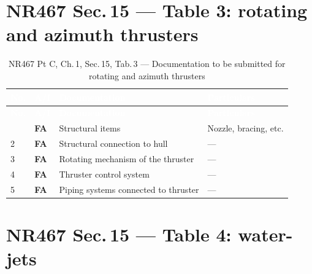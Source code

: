 \documentclass[11pt,a4paper]{report}
\newcommand{\fa}{\textbf{\textcolor{warningred}{FA}}}
\begin{document}
\section{NR467 Sec.\,15 --- Table 3: rotating and azimuth thrusters}

\begin{longtable}{|p{0.7cm}|p{1.1cm}|p{6.2cm}|p{6.0cm}|}
\caption{NR467 Pt C, Ch.\,1, Sec.\,15, Tab.\,3 --- Documentation to be submitted for rotating and azimuth thrusters} \label{tab:s15t3} \\
\hline
\rowcolor{bvblue}
\textcolor{white}{\textbf{No.}} & \textcolor{white}{\textbf{A/I}} & \textcolor{white}{\textbf{Documentation}} & \textcolor{white}{\textbf{Particulars}} \\
\hline
\endfirsthead
\hline
\rowcolor{bvblue}
\textcolor{white}{\textbf{No.}} & \textcolor{white}{\textbf{A/I}} & \textcolor{white}{\textbf{Documentation}} & \textcolor{white}{\textbf{Particulars}} \\
\hline
\endhead
\hline
\endlastfoot
1 & \fa{} & Structural items & Nozzle, bracing, etc. \\
\hline
2 & \fa{} & Structural connection to hull & --- \\
\hline
3 & \fa{} & Rotating mechanism of the thruster & --- \\
\hline
4 & \fa{} & Thruster control system & --- \\
\hline
5 & \fa{} & Piping systems connected to thruster & --- \\
\hline
\end{longtable}

\section{NR467 Sec.\,15 --- Table 4: water-jets}
\end{document}
